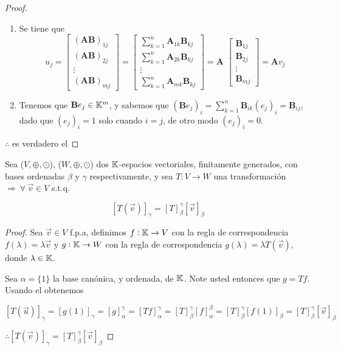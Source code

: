 \begin{proof}

\begin{enumerate}
    \item Se tiene que $$u_j=\begin{bmatrix}
        (\textbf{AB})_{1j} \\
        (\textbf{AB})_{2j} \\
        \vdots \\
        (\textbf{AB})_{mj}
    \end{bmatrix}=\begin{bmatrix}
        \sum\limits_{k=1}^n \textbf{A}_{1k}\textbf{B}_{kj} \\
        \sum\limits_{k=1}^n \textbf{A}_{2k}\textbf{B}_{kj} \\
        \vdots \\
        \sum\limits_{k=1}^n \textbf{A}_{mk}\textbf{B}_{kj}
    \end{bmatrix}= \textbf{A } \begin{bmatrix}
        \textbf{B}_{1j} \\
        \textbf{B}_{2j} \\
        \vdots \\
        \textbf{B}_{mj}
    \end{bmatrix}=\textbf{A}v_j $$
    \item  Tenemos que $\textbf{B}e_j \in \mathbb{K}^m$, y sabemos que $(\textbf{B}e_j)_i=\sum\limits_{k=1}^n\textbf{B}_{ik}(e_j)_i=\textbf{B}_{ij}$, dado que $(e_j)_i=1$ solo cuando $i=j$, de otro modo $(e_j)_i=0$. 
\end{enumerate}
   $\therefore$ es verdadero el 
\end{proof}

\begin{theorem}
\label{theom2014fb}
   Sea ($V, \oplus, \odot$), ($W, \oplus, \odot$) dos $\mathbb{K}$-espacios vectoriales, finitamente generados, con bases ordenadas $\beta$ y $\gamma$ respectivamente, y sea $T:V \to W$ una transformación $\Rightarrow \: \forall \: \vec{v} \in V$ s.t.q. 
   
   $$[T(\vec{v})]_{\gamma}=[T]_{\beta}^{\gamma}[\vec{v}]_{\beta}$$
\end{theorem}

\begin{proof}
    Sea $\vec{v} \in V$ f.p.a, definimos $f:\mathbb{K} \to V$ con la regla de correspondencia $f(\lambda)=\lambda \vec{v}$ y $g:\mathbb{K} \to W$ con la regla de correspondencia $g(\lambda)=\lambda T(\vec{v})$, donde $\lambda \in \mathbb{K}$. 
    
    Sea $\alpha=\{1\}$ la base canónica, y ordenada, de $\mathbb{K}$. Note usted entonces que $g=Tf$. Usando el  obtenemos 
    
    $$[T(\vec{u})]_{\gamma}=[g(1)]_{\gamma}=[g]_{\alpha}^{\gamma}=[Tf]_{\alpha}^{\gamma}=[T]_{\beta}^{\gamma}[f]_{\alpha}^{\beta}=[T]_{\beta}^{\gamma}[f(1)]_{\beta}=[T]_{\beta}^{\gamma}[\vec{v}]_{\beta}$$

    $\therefore [T(\vec{v})]_{\gamma}=[T]_{\beta}^{\gamma}[\vec{v}]_{\beta}$
\end{proof}


